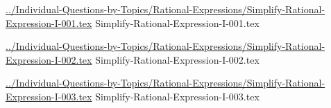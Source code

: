 \documentclass[answer,cancelspace,12pt]{exam}
\begin{document}
\begin{questions}








\question
\href{../Individual-Questions-by-Topics/Rational-Expressions/Simplify-Rational-Expression-I-001.tex}{../Individual-Questions-by-Topics/Rational-Expressions/Simplify-Rational-Expression-I-001.tex}
{Simplify-Rational-Expression-I-001.tex}


\question
\href{../Individual-Questions-by-Topics/Rational-Expressions/Simplify-Rational-Expression-I-002.tex}{../Individual-Questions-by-Topics/Rational-Expressions/Simplify-Rational-Expression-I-002.tex}
{Simplify-Rational-Expression-I-002.tex}

\question
\href{../Individual-Questions-by-Topics/Rational-Expressions/Simplify-Rational-Expression-I-003.tex}{../Individual-Questions-by-Topics/Rational-Expressions/Simplify-Rational-Expression-I-003.tex}
{Simplify-Rational-Expression-I-003.tex}


\end{questions}
\end{document}

